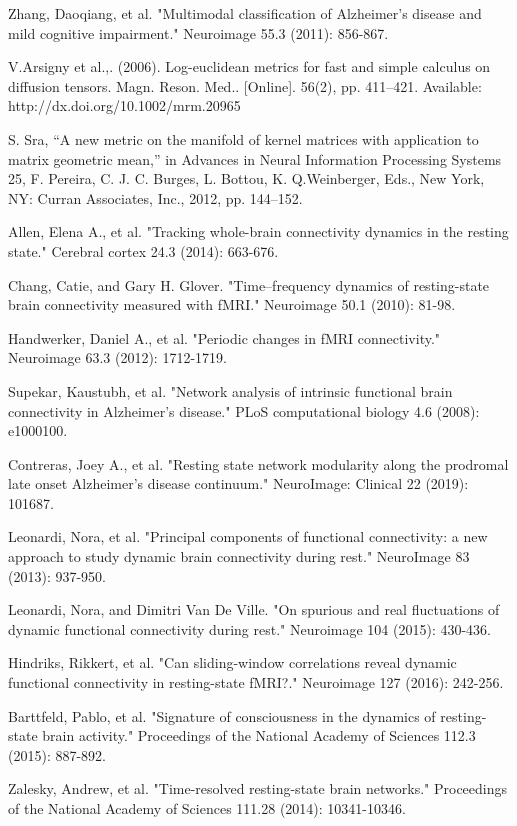 \documentclass[preprint,12pt]{elsarticle}
\begin{document}
\begin{thebibliography}{1}
			Zhang, Daoqiang, et al. "Multimodal classification of Alzheimer's disease and mild cognitive impairment." Neuroimage 55.3 (2011): 856-867.
			
			V.Arsigny et al.,. (2006). Log-euclidean metrics for fast and simple calculus
			on diffusion tensors. Magn. Reson. Med.. [Online]. 56(2), pp. 411–421.
			Available: http://dx.doi.org/10.1002/mrm.20965
			
			S. Sra, “A new metric on the manifold of kernel matrices with application
			to matrix geometric mean,” in Advances in Neural Information Processing
			Systems 25, F. Pereira, C. J. C. Burges, L. Bottou, K. Q.Weinberger, Eds.,
			New York, NY: Curran Associates, Inc., 2012, pp. 144–152.
			
			Allen, Elena A., et al. "Tracking whole-brain connectivity dynamics in the resting state." Cerebral cortex 24.3 (2014): 663-676.
			
			Chang, Catie, and Gary H. Glover. "Time–frequency dynamics of resting-state brain connectivity measured with fMRI." Neuroimage 50.1 (2010): 81-98.
			
			Handwerker, Daniel A., et al. "Periodic changes in fMRI connectivity." Neuroimage 63.3 (2012): 1712-1719.
			
			Supekar, Kaustubh, et al. "Network analysis of intrinsic functional brain connectivity in Alzheimer's disease." PLoS computational biology 4.6 (2008): e1000100.
			
			Contreras, Joey A., et al. "Resting state network modularity along the prodromal late onset Alzheimer's disease continuum." NeuroImage: Clinical 22 (2019): 101687.
		
			Leonardi, Nora, et al. "Principal components of functional connectivity: a new approach to study dynamic brain connectivity during rest." NeuroImage 83 (2013): 937-950.
	
			Leonardi, Nora, and Dimitri Van De Ville. "On spurious and real fluctuations of dynamic functional connectivity during rest." Neuroimage 104 (2015): 430-436.
			
			Hindriks, Rikkert, et al. "Can sliding-window correlations reveal dynamic functional connectivity in resting-state fMRI?." Neuroimage 127 (2016): 242-256.
			
			Barttfeld, Pablo, et al. "Signature of consciousness in the dynamics of resting-state brain activity." Proceedings of the National Academy of Sciences 112.3 (2015): 887-892.
			
			Zalesky, Andrew, et al. "Time-resolved resting-state brain networks." Proceedings of the National Academy of Sciences 111.28 (2014): 10341-10346.
				
\end{thebibliography}
\end{document}

